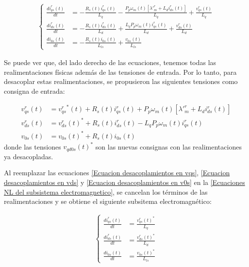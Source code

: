 \documentclass[a4paper, 10pt, onecolumn,journal]{ieeeconf}
\begin{document}
\begin{align}
	\begin{cases}
		\frac{d i^r_{qs}(t)}{dt} &= -\frac{R_s(t) i^r_{qs}(t)}{L_q} - \frac{P_p \omega_m(t) \left[\lambda'^r_m + L_d i^r_{ds}(t)\right]}{L_q} + \frac{v^r_{qs}(t)}{L_q}\\
		\frac{d i^r_{ds}(t)}{dt} &= -\frac{R_s(t) i^r_{ds}(t)}{L_d} + \frac{L_q P_p \omega_m(t)i^r_{qs}(t)}{L_d}  + \frac{v^r_{ds}(t)}{L_d} \\ 
		\frac{d i_{0s}(t)}{dt}   &= -\frac{R_s(t) i_{0s}(t)}{L_{ls}} + \frac{v_{0s}(t)}{L_{ls}}
	\end{cases}	\label{Ecuaciones NL del subsistema electromagnetico}
\end{align}

 Se puede ver que, del lado derecho de las ecuaciones, tenemos todas las realimentaciones físicas además de las tensiones de entrada. Por lo tanto, para desacoplar estas realimentaciones, se propusieron las siguientes tensiones como consigna de entrada:
 
 \begin{align}
 	v^r_{qs}(t) &= {v^r_{qs}}^*(t) + R_s(t) i^r_{qs}(t) + P_p \omega_m(t) \left[\lambda'^r_m + L_d i^r_{ds}(t)\right] \label{Ecuacion desacoplamientos en vqs}\\
 	v^r_{ds}(t) &= {v^r_{ds}(t)}^* + R_s(t) i^r_{ds}(t) - L_q P_p \omega_m(t)i^r_{qs}(t) \label{Ecuacion desacoplamientos en vds}\\ 
 	v_{0s}(t)   &= {v_{0s}(t)}^* + R_s(t) i_{0s}(t) \label{Ecuacion desacoplamientos en v0s}
 \end{align}
donde las tensiones  ${v_{qd0s}(t)}^*$ son las nuevas consignas con las realimentaciones ya desacopladas.

Al reemplazar las ecuaciones \eqref{Ecuacion desacoplamientos en vqs}, \eqref{Ecuacion desacoplamientos en vds} y \eqref{Ecuacion desacoplamientos en v0s} en la \cref{Ecuaciones NL del subsistema electromagnetico}, se cancelan los términos de las realimentaciones y se obtiene el siguiente subsitema electromagnético:

\begin{align}
	\begin{cases}
		\frac{d i^r_{qs}(t)}{dt} &= \frac{{v^r_{qs}(t)}^*}{L_q}\\
		\frac{d i^r_{ds}(t)}{dt} &= \frac{{v^r_{ds}(t)}^*}{L_d} \\ 
		\frac{d i_{0s}(t)}{dt}   &= \frac{{v_{0s}(t)}^*}{L_{ls}}
	\end{cases}	\label{Ecuaciones del subsistema electromagnetico sin realimentaciones fisicas}
\end{align}
\end{document}
